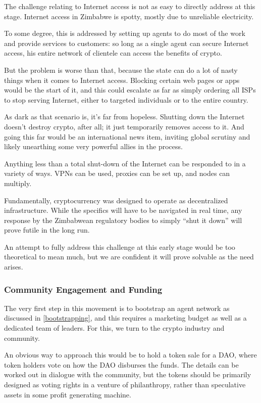 \documentclass{article}
\begin{document}
The challenge relating to Internet access is not as easy to directly address at this stage. Internet access in Zimbabwe is spotty, mostly due to unreliable electricity.

To some degree, this is addressed by setting up agents to do most of the work and provide services to customers: so long as a single agent can secure Internet access, his entire network of clientele can access the benefits of crypto.

But the problem is worse than that, because the state can do a lot of nasty things when it comes to Internet access. Blocking certain web pages or apps would be the start of it, and this could escalate as far as simply ordering all ISPs to stop serving Internet, either to targeted individuals or to the entire country.

As dark as that scenario is, it's far from hopeless. Shutting down the Internet doesn't destroy crypto, after all; it just temporarily removes access to it. And going this far would be an international news item, inviting global scrutiny and likely unearthing some very powerful allies in the process.

Anything less than a total shut-down of the Internet can be responded to in a variety of ways. VPNs can be used, proxies can be set up, and nodes can multiply.

Fundamentally, cryptocurrency was designed to operate as decentralized infrastructure. While the specifics will have to be navigated in real time, any response by the Zimbabwean regulatory bodies to simply ``shut it down'' will prove futile in the long run.

An attempt to fully address this challenge at this early stage would be too theoretical to mean much, but we are confident it will prove solvable as the need arises.

\subsubsection{Community Engagement and Funding} \label{community funding}

The very first step in this movement is to bootstrap an agent network as discussed in \ref{bootstrapping}, and this requires a marketing budget as well as a dedicated team of leaders. For this, we turn to the crypto industry and community.

An obvious way to approach this would be to hold a token sale for a DAO, where token holders vote on how the DAO disburses the funds. The details can be worked out in dialogue with the community, but the tokens should be primarily designed as voting rights in a venture of philanthropy, rather than speculative assets in some profit generating machine.
\end{document}
